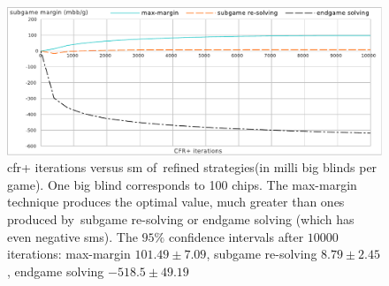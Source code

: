 \begin{figure}[H]
  \centering
  \includegraphics[width=\textwidth]{../img/sm-experiments}
  \def\captionTitle{\acrshort{cfr}+ iterations versus \acrshort{sm} of~refined strategies}
  \caption[\captionTitle]{\captionTitle (in milli big blinds per game).
    One big blind corresponds to 100 chips.
    The max-margin technique produces the optimal value, much greater than ones produced by~subgame re-solving or endgame solving (which has even negative \acrshort{sm}s).
    The $95\%$ confidence intervals after $10000$ iterations:
    max-margin $101.49 \pm 7.09$, subgame re-solving $8.79 \pm 2.45$, endgame solving $-518.5 \pm 49.19$
  }
  \label{fig:sm-experiments}
\end{figure}
